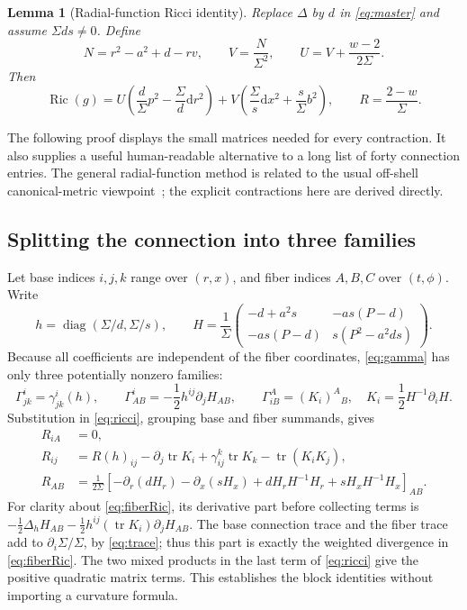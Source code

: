 \documentclass[11pt,a4paper]{article}
\numberwithin{equation}{section}
\newtheorem{lemma}[theorem]{Lemma}
\theoremstyle{definition}\newtheorem{definition}[theorem]{Definition}
\theoremstyle{remark}\newtheorem{remark}[theorem]{Remark}
\newcommand{\Ric}{\operatorname{Ric}}
\newcommand{\tr}{\operatorname{tr}}
\newcommand{\dd}{\mathrm{d}}
\begin{document}
\begin{lemma}[Radial-function Ricci identity]\label{lem:offshell}
Replace $\Delta$ by $d$ in \eqref{eq:master} and assume $\Sigma d s\ne0$. Define
\begin{equation}\label{eq:UV}
 N=r^2-a^2+d-rv,\qquad V=\frac{N}{\Sigma^2},\qquad
 U=V+\frac{w-2}{2\Sigma}.
\end{equation}
Then
\begin{equation}\label{eq:offshell}
 \Ric(g)=U\left(\frac d\Sigma p^2-\frac\Sigma d\dd r^2\right)
       +V\left(\frac\Sigma s\dd x^2+\frac s\Sigma b^2\right),
 \qquad R=\frac{2-w}{\Sigma}.
\end{equation}
\end{lemma}

The following proof displays the small matrices needed for every contraction. It also supplies a useful human-readable alternative to a long list of forty connection entries. The general radial-function method is related to the usual off-shell canonical-metric viewpoint~\cite{frolov}; the explicit contractions here are derived directly.

\subsection{Splitting the connection into three families}
Let base indices $i,j,k$ range over $(r,x)$, and fiber indices $A,B,C$ over $(t,\phi)$. Write
\[
 h=\operatorname{diag}(\Sigma/d,\Sigma/s),\qquad
 H=\frac1\Sigma\begin{pmatrix}
 -d+a^2s&-as(P-d)\\-as(P-d)&s(P^2-a^2ds)
 \end{pmatrix}.
\]
Because all coefficients are independent of the fiber coordinates, \eqref{eq:gamma} has only three potentially nonzero families:
\begin{equation}\label{eq:three-gamma}
 \Gamma^i_{jk}=\gamma^i_{jk}(h),\qquad
 \Gamma^i_{AB}=-\frac12h^{ij}\partial_jH_{AB},\qquad
 \Gamma^A_{iB}=(K_i)^A{}_B,\quad K_i=\frac12H^{-1}\partial_iH.
\end{equation}
Substitution in \eqref{eq:ricci}, grouping base and fiber summands, gives
\begin{align}
 R_{iA}&=0,\label{eq:mixedzero}\\
 R_{ij}&=R(h)_{ij}-\partial_j\tr K_i
          +\gamma^k_{ij}\tr K_k-\tr(K_iK_j),\label{eq:baseRic}\\
 R_{AB}&=\frac1{2\Sigma}\left[-\partial_r(dH_r)-\partial_x(sH_x)
                  +dH_rH^{-1}H_r+sH_xH^{-1}H_x\right]_{AB}.\label{eq:fiberRic}
\end{align}
For clarity about \eqref{eq:fiberRic}, its derivative part before collecting terms is
$-\tfrac12\Delta_h H_{AB}-\tfrac12h^{ij}(\tr K_i)\partial_jH_{AB}$.
The base connection trace and the fiber trace add to $\partial_i\Sigma/\Sigma$, by \eqref{eq:trace}; thus this part is exactly the weighted divergence in \eqref{eq:fiberRic}. The two mixed products in the last term of \eqref{eq:ricci} give the positive quadratic matrix terms. This establishes the block identities without importing a curvature formula.
\end{document}
